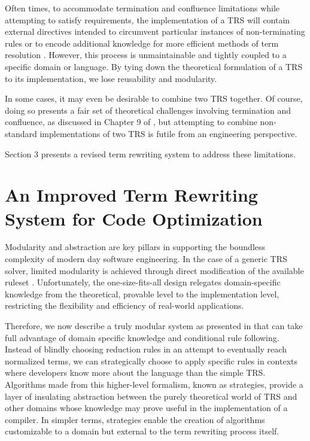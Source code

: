 \documentclass{article}
\begin{document}
Often times, to accommodate termination and confluence limitations while attempting to satisfy requirements,
the implementation of a TRS will contain external directives intended to circumvent particular instances of non-terminating rules
or to encode additional knowledge for more efficient methods of term resolution \cite{spoofax}.
However, this process is unmaintainable and tightly coupled to a specific domain or language.
By tying down the theoretical formulation of a TRS to its implementation, we lose reusability and modularity.

In some cases, it may even be desirable to combine two TRS together. Of course, doing so presents a fair set of theoretical challenges
involving termination and confluence,
as discussed in Chapter 9 of \cite{baader1998term}, but attempting to combine non-standard implementations of two TRS is futile from an engineering perspective.

Section 3 presents a revised term rewriting system to address these limitations.

\section{An Improved Term Rewriting System for Code Optimization}


Modularity and abstraction are key pillars in supporting the boundless complexity of modern day software engineering.
In the case of a generic TRS solver, limited modularity is achieved through direct modification of the available ruleset \cite{baader1998term}.
Unfortunately, the one-size-fits-all design relegates domain-specific knowledge from the theoretical, provable level to the implementation level,
restricting the flexibility and efficiency of real-world applications.

Therefore, we now describe a truly modular system as presented in \cite{elco1998building} that can take full advantage of domain specific knowledge and conditional rule following.
Instead of blindly choosing reduction rules in an attempt to eventually reach normalized terms, we can strategically choose to apply
specific rules in contexts where developers know more about the language than the simple TRS. Algorithms made from this higher-level formalism, known as strategies, provide a layer of insulating abstraction
between the purely theoretical world of TRS and other domains whose knowledge may prove useful in the implementation of a compiler.
In simpler terms, strategies enable the creation of algorithms customizable to a domain but external to the term rewriting process itself.
\end{document}
